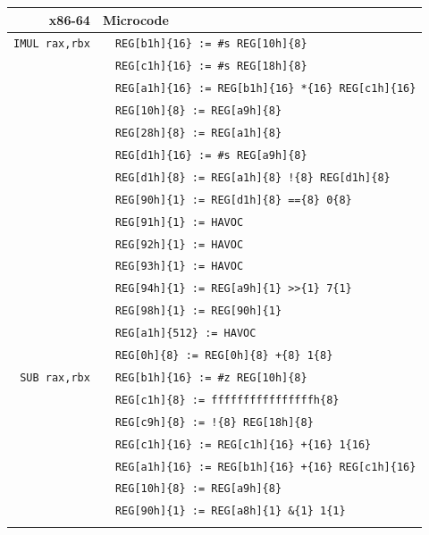 \documentclass[10pt,twocolumn]{article}
\begin{document}
\begin{table}[!h]
\begin{center}
\begin{tabular}{r|rl}
\textbf{x86-64} & \multicolumn{2}{l}{\textbf{Microcode}}
\\ \hline

\texttt{IMUL rax,rbx} & %
& \texttt{REG[b1h]\{16\} := \#s REG[10h]\{8\}} \\ & %
& \texttt{REG[c1h]\{16\} := \#s REG[18h]\{8\}} \\ & %
& \texttt{REG[a1h]\{16\} := REG[b1h]\{16\} *\{16\} REG[c1h]\{16\}} \\ & %
& \texttt{REG[10h]\{8\} := REG[a9h]\{8\}} \\ & %
& \texttt{REG[28h]\{8\} := REG[a1h]\{8\}} \\ & %
& \texttt{REG[d1h]\{16\} := \#s REG[a9h]\{8\}} \\ & %
& \texttt{REG[d1h]\{8\} := REG[a1h]\{8\} !\{8\} REG[d1h]\{8\}} \\ & %
& \texttt{REG[90h]\{1\} := REG[d1h]\{8\} ==\{8\} 0\{8\}} \\ & %
& \texttt{REG[91h]\{1\} := HAVOC} \\ & %
& \texttt{REG[92h]\{1\} := HAVOC} \\ & %
& \texttt{REG[93h]\{1\} := HAVOC} \\ & %
& \texttt{REG[94h]\{1\} := REG[a9h]\{1\} >>\{1\} 7\{1\}} \\ & %
& \texttt{REG[98h]\{1\} := REG[90h]\{1\}} \\ & %
& \texttt{REG[a1h]\{512\} := HAVOC} \\ & %
& \texttt{REG[0h]\{8\} := REG[0h]\{8\} +\{8\} 1\{8\}} \\ \hline

\texttt{SUB rax,rbx} & %

& \texttt{REG[b1h]\{16\} := \#z REG[10h]\{8\}} \\ & %
& \texttt{REG[c1h]\{8\} := ffffffffffffffffh\{8\}} \\ & %
& \texttt{REG[c9h]\{8\} := !\{8\} REG[18h]\{8\}} \\ & %
& \texttt{REG[c1h]\{16\} := REG[c1h]\{16\} +\{16\} 1\{16\}} \\ & %
& \texttt{REG[a1h]\{16\} := REG[b1h]\{16\} +\{16\} REG[c1h]\{16\}} \\ & %
& \texttt{REG[10h]\{8\} := REG[a9h]\{8\}} \\ & %

& \texttt{REG[90h]\{1\} := REG[a8h]\{1\} \&\{1\} 1\{1\}} \\ & %


\end{tabular}
\end{center}
\end{table}
\end{document}
